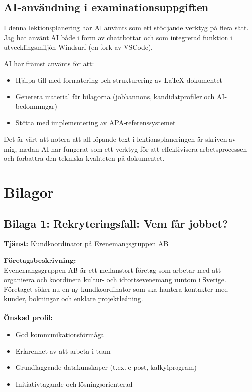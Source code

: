 \documentclass[12pt]{article}
\begin{document}
\break
\subsection*{AI-användning i examinationsuppgiften}

I denna lektionsplanering har AI använts som ett stödjande verktyg på flera sätt. Jag har använt AI både i form av chattbottar och som integrerad funktion i utvecklingsmiljön Windsurf (en fork av VSCode). 

AI har främst använts för att:
\begin{itemize}
  \item Hjälpa till med formatering och strukturering av LaTeX-dokumentet
  \item Generera material för bilagorna (jobbannons, kandidatprofiler och AI-bedömningar)
  \item Stötta med implementering av APA-referenssystemet
\end{itemize}

Det är värt att notera att all löpande text i lektionsplaneringen är skriven av mig, medan AI har fungerat som ett verktyg för att effektivisera arbetsprocessen och förbättra den tekniska kvaliteten på dokumentet.

\printbibliography[title=Referenser]

\appendix
\break
\section*{Bilagor}

\subsection*{Bilaga 1: Rekryteringsfall: Vem får jobbet?}

\begin{minipage}{\textwidth}
\textbf{Tjänst:} Kundkoordinator på Evenemangsgruppen AB

\textbf{Företagsbeskrivning:}\\  
Evenemangsgruppen AB är ett mellanstort företag som arbetar med att organisera och koordinera kultur- och idrottsevenemang runtom i Sverige. Företaget söker nu en ny kundkoordinator som ska hantera kontakter med kunder, bokningar och enklare projektledning.
\\ \\
\textbf{Önskad profil:}  
\begin{itemize}[leftmargin=*,noitemsep]
\item God kommunikationsförmåga
\item Erfarenhet av att arbeta i team
\item Grundläggande datakunskaper (t.ex. e-post, kalkylprogram)
\item Initiativtagande och lösningsorienterad
\end{itemize}
\end{minipage}
\end{document}
